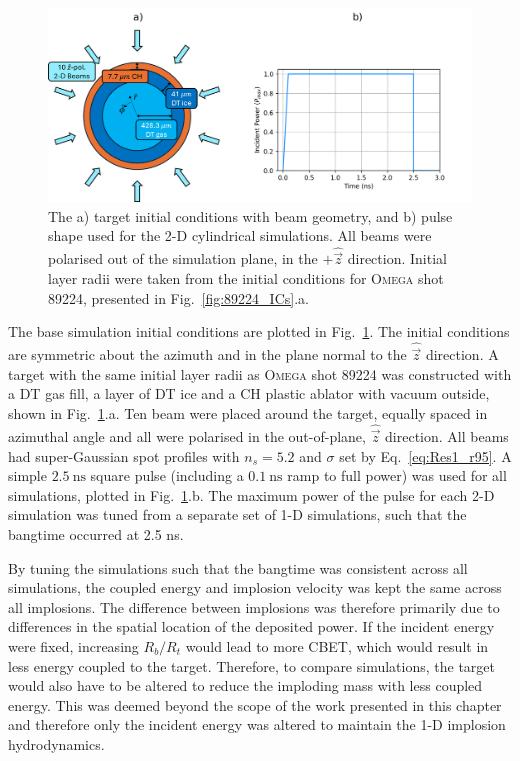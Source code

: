 \begin{figure}[t!]
    \includegraphics[width=\linewidth]{Results1/Images/cyl_setup.png}
    \centering
    \caption{The a) target initial conditions with beam geometry, and b) pulse shape used for the 2-D cylindrical simulations.
    All beams were polarised out of the simulation plane, in the $+\hat{\vec{z}}$ direction.
    Initial layer radii were taken from the initial conditions for \textsc{Omega} shot 89224, presented in Fig.~\ref{fig:89224_ICs}.a.}%
    \label{fig:Res1_cyl_setup}
\end{figure}

The base simulation initial conditions are plotted in Fig.~\ref{fig:Res1_cyl_setup}.
The initial conditions are symmetric about the azimuth and in the plane normal to the $\hat{\vec{z}}$ direction.
A target with the same initial layer radii as \textsc{Omega} shot 89224 was constructed with a DT gas fill, a layer of DT ice and a CH plastic ablator with vacuum outside, shown in Fig.~\ref{fig:Res1_cyl_setup}.a.
Ten beam were placed around the target, equally spaced in azimuthal angle and all were polarised in the out-of-plane, $\hat{\vec{z}}$ direction.
All beams had super-Gaussian spot profiles with $n_s=5.2$ and $\sigma$ set by Eq.~\ref{eq:Res1_r95}.
A simple $2.5\ \text{ns}$ square pulse (including a $0.1\ \text{ns}$ ramp to full power) was used for all simulations, plotted in Fig.~\ref{fig:Res1_cyl_setup}.b.
The maximum power of the pulse for each 2-D simulation was tuned from a separate set of 1-D simulations, such that the bangtime occurred at 2.5 ns.

By tuning the simulations such that the bangtime was consistent across all simulations, the coupled energy and implosion velocity was kept the same across all implosions.
The difference between implosions was therefore primarily due to differences in the spatial location of the deposited power.
If the incident energy were fixed, increasing $R_b/R_t$ would lead to more \ac{CBET}, which would result in less energy coupled to the target.
Therefore, to compare simulations, the target would also have to be altered to reduce the imploding mass with less coupled energy.
This was deemed beyond the scope of the work presented in this chapter and therefore only the incident energy was altered to maintain the 1-D implosion hydrodynamics.

